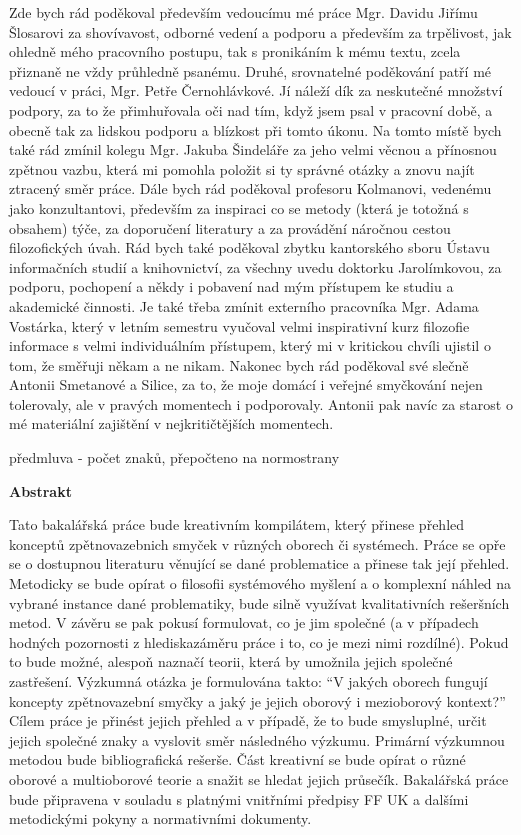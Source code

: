 \documentclass[11pt,a4paper]{article}
\begin{document}
\vspace*{\fill}
Zde bych rád poděkoval především vedoucímu mé práce Mgr. Davidu Jiřímu Šlosarovi za shovívavost, odborné vedení a podporu a především za trpělivost, jak ohledně mého pracovního postupu, tak s pronikáním k mému textu, zcela přiznaně ne vždy průhledně psanému. Druhé, srovnatelné poděkování patří mé vedoucí v práci, Mgr. Petře Černohlávkové. Jí náleží dík za neskutečné množství podpory, za to že přimhuřovala oči nad tím, když jsem psal v pracovní době, a obecně tak za lidskou podporu a blízkost při tomto úkonu. Na tomto místě bych také rád zmínil kolegu Mgr. Jakuba Šindeláře za jeho velmi věcnou a přínosnou zpětnou vazbu, která mi pomohla položit si ty správné otázky a znovu najít ztracený směr práce. Dále bych rád poděkoval profesoru Kolmanovi, vedenému jako konzultantovi, především za inspiraci co se metody (která je totožná s obsahem) týče, za doporučení literatury a za provádění náročnou cestou filozofických úvah. Rád bych také poděkoval zbytku kantorského sboru Ústavu informačních studií a knihovnictví, za všechny uvedu doktorku Jarolímkovou, za podporu, pochopení a někdy i pobavení nad mým přístupem ke studiu a akademické činnosti. Je také třeba zmínit externího pracovníka Mgr. Adama Vostárka, který v letním semestru vyučoval velmi inspirativní kurz filozofie informace s velmi individuálním přístupem, který mi v kritickou chvíli ujistil o tom, že směřuji někam a ne nikam. Nakonec bych rád poděkoval své slečně Antonii Smetanové a Silice, za to, že moje domácí i veřejné smyčkování nejen tolerovaly, ale v pravých momentech i podporovaly. Antonii pak navíc za starost o mé materiální zajištění v nejkritičtějších momentech.
\pagebreak


\vspace*{\fill}
předmluva - počet znaků, přepočteno na normostrany
\pagebreak


\vspace{1cm}
\noindent \Large \textbf{Abstrakt}

\noindent Tato bakalářská práce bude kreativním kompilátem, který přinese přehled konceptů zpětnovazebnich smyček v různých oborech či systémech. Práce se opře se o dostupnou literaturu věnující se dané problematice a přinese tak její přehled. Metodicky se bude opírat o filosofii systémového myšlení a o komplexní náhled na vybrané instance dané problematiky, bude silně využívat kvalitativních rešeršních metod. V závěru se pak pokusí formulovat, co je jim společné (a v případech hodných pozornosti z hlediskazáměru práce i to, co je mezi nimi rozdílné). Pokud to bude možné, alespoň naznačí teorii, která by umožnila jejich společné zastřešení. Výzkumná otázka je formulována takto: “V jakých oborech fungují koncepty zpětnovazební smyčky a jaký je jejich oborový i mezioborový kontext?” Cílem práce je přinést jejich přehled a v případě, že to bude smysluplné, určit jejich společné znaky a vyslovit směr následného výzkumu. Primární výzkumnou metodou bude bibliografická rešerše. Část kreativní se bude opírat o různé oborové a multioborové teorie a snažit se hledat jejich průsečík.
Bakalářská práce bude připravena v souladu s platnými vnitřními předpisy FF UK a dalšími metodickými pokyny a normativními dokumenty.
\end{document}

